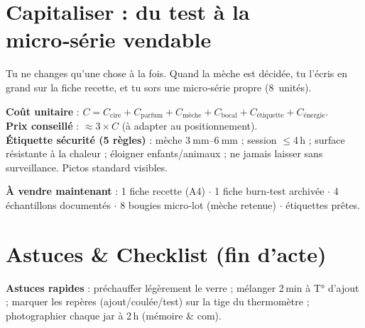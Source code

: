 \documentclass[../../main.tex]{subfiles}
\begin{document}
\section{Capitaliser : du test à la micro‑série vendable}

Tu ne changes qu’une chose à la fois. Quand la mèche est décidée, tu l’écris en grand sur la fiche recette, et tu sors une micro‑série propre (8~unités).

\begin{BlocCouts}
\textbf{Coût unitaire} : \(C = C_{\text{cire}} + C_{\text{parfum}} + C_{\text{mèche}} + C_{\text{bocal}} + C_{\text{étiquette}} + C_{\text{énergie}}\). \\
\textbf{Prix conseillé} : \(\approx 3\times C\) (à adapter au positionnement). \\
\textbf{Étiquette sécurité (5 règles)} : mèche \(\SIrange{3}{6}{\milli\meter}\) ; session \(\leq\)4\,h ; surface résistante à la chaleur ; éloigner enfants/animaux ; ne jamais laisser sans surveillance. Pictos standard visibles.
\end{BlocCouts}

\spacer

\begin{BlocAVendre}
\textbf{À vendre maintenant} : 1 fiche recette (A4) \(\cdot\) 1 fiche burn‑test archivée \(\cdot\) 4 échantillons documentés \(\cdot\) 8 bougies micro‑lot (mèche retenue) \(\cdot\) étiquettes prêtes.
\end{BlocAVendre}

\section*{Astuces \& Checklist (fin d’acte)}

\begin{BlocAstuce}
\textbf{Astuces rapides} : préchauffer légèrement le verre ; mélanger 2\,min à T° d’ajout ; marquer les repères (ajout/coulée/test) sur la tige du thermomètre ; photographier chaque jar à 2\,h (mémoire \& com).
\end{BlocAstuce}

\spacer
\end{document}
